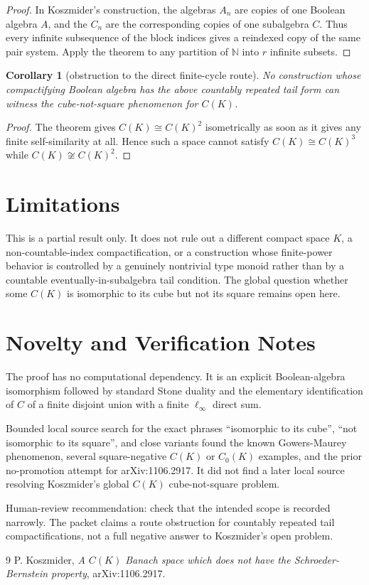 \documentclass[11pt]{article}
\newtheorem{corollary}{Corollary}
\newcommand{\N}{\mathbb{N}}
\begin{document}
\begin{proof}
In Koszmider's construction, the algebras $A_n$ are copies of one Boolean algebra $A$, and the $C_n$ are the corresponding copies of one subalgebra $C$. Thus every infinite subsequence of the block indices gives a reindexed copy of the same pair system. Apply the theorem to any partition of $\N$ into $r$ infinite subsets.
\end{proof}

\begin{corollary}[obstruction to the direct finite-cycle route]
No construction whose compactifying Boolean algebra has the above countably repeated tail form can witness the cube-not-square phenomenon for $C(K)$.
\end{corollary}

\begin{proof}
The theorem gives $C(K)\cong C(K)^2$ isometrically as soon as it gives any finite self-similarity at all. Hence such a space cannot satisfy $C(K)\cong C(K)^3$ while $C(K)\not\cong C(K)^2$.
\end{proof}

\section*{Limitations}

This is a partial result only. It does not rule out a different compact space $K$, a non-countable-index compactification, or a construction whose finite-power behavior is controlled by a genuinely nontrivial type monoid rather than by a countable eventually-in-subalgebra tail condition. The global question whether some $C(K)$ is isomorphic to its cube but not its square remains open here.

\section*{Novelty and Verification Notes}

The proof has no computational dependency. It is an explicit Boolean-algebra isomorphism followed by standard Stone duality and the elementary identification of $C$ of a finite disjoint union with a finite $\ell_\infty$ direct sum.

Bounded local source search for the exact phrases ``isomorphic to its cube'', ``not isomorphic to its square'', and close variants found the known Gowers-Maurey phenomenon, several square-negative $C(K)$ or $C_0(K)$ examples, and the prior no-promotion attempt for arXiv:1106.2917. It did not find a later local source resolving Koszmider's global $C(K)$ cube-not-square problem.

Human-review recommendation: check that the intended scope is recorded narrowly. The packet claims a route obstruction for countably repeated tail compactifications, not a full negative answer to Koszmider's open problem.

\begin{thebibliography}{9}
P. Koszmider,
\emph{A $C(K)$ Banach space which does not have the Schroeder-Bernstein property},
arXiv:1106.2917.
\end{thebibliography}
\end{document}
